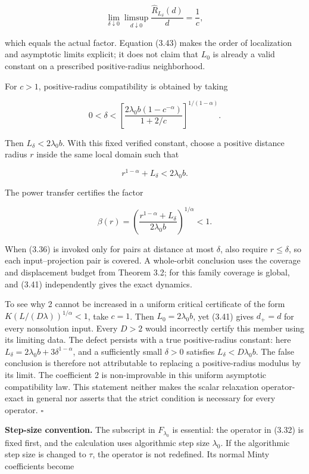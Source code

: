 \documentclass[11pt,a4paper]{article}
\theoremstyle{plain}
\theoremstyle{definition}
\theoremstyle{remark}
\begin{document}
\[
\lim_{\delta\downarrow0}\limsup_{d\downarrow0}
\frac{\widehat R_{L_\delta}(d)}{d}
=\frac1c,
\tag{3.43}
\]

which equals the actual factor. Equation (3.43) makes the order of
localization and asymptotic limits explicit; it does not claim that
\(L_0\) is already a valid constant on a prescribed positive-radius
neighborhood.

For \(c>1\), positive-radius compatibility is obtained by taking

\[
0<\delta<
\left[
\frac{2\lambda_0b(1-c^{-\alpha})}{1+2/c}
\right]^{1/(1-\alpha)}.
\tag{3.44}
\]

Then \(L_\delta<2\lambda_0b\). With this fixed verified constant, choose
a positive distance radius \(r\) inside the same local domain such that

\[
r^{1-\alpha}+L_\delta<2\lambda_0b.
\tag{3.45}
\]

The power transfer certifies the factor

\[
\beta(r)=\left(\frac{r^{1-\alpha}+L_\delta}{2\lambda_0b}\right)^{1/\alpha}<1.
\tag{3.46}
\]

When (3.36) is invoked only for pairs at distance at most \(\delta\),
also require \(r\le\delta\), so each input--projection pair is covered.
A whole-orbit conclusion uses the coverage and displacement budget from
Theorem 3.2; for this family coverage is global, and (3.41)
independently gives the exact dynamics.

To see why 2 cannot be increased in a uniform critical certificate of
the form \(K(L/(D\lambda))^{1/\alpha}<1\), take \(c=1\). Then
\(L_0=2\lambda_0b\), yet (3.41) gives \(d_+=d\) for every nonsolution
input. Every \(D>2\) would incorrectly certify this member using its
limiting data. The defect persists with a true positive-radius constant:
here \(L_\delta=2\lambda_0b+3\delta^{1-\alpha}\), and a sufficiently
small \(\delta>0\) satisfies \(L_\delta<D\lambda_0b\). The false
conclusion is therefore not attributable to replacing a positive-radius
modulus by its limit. The coefficient 2 is non-improvable in this
uniform asymptotic compatibility law. This statement neither makes the
scalar relaxation operator-exact in general nor asserts that the strict
condition is necessary for every operator. \(\square\)

\textbf{Step-size convention.} The subscript in \(F_{\lambda_0}\) is
essential: the operator in (3.32) is fixed first, and the calculation
uses algorithmic step size \(\lambda_0\). If the algorithmic step size
is changed to \(\tau\), the operator is not redefined. Its normal Minty
coefficients become
\end{document}
